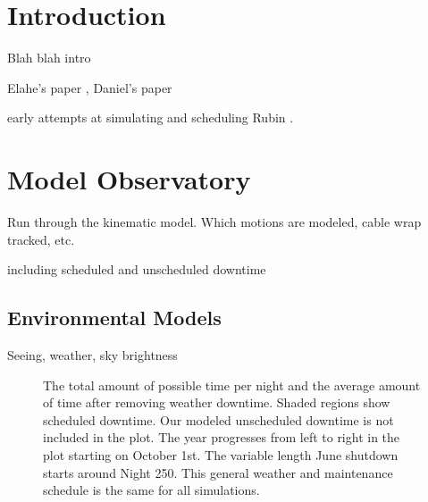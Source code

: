 \documentclass[]{aastex631}
\begin{document}

\section{Introduction} \label{sec:intro}
Blah blah intro

Elahe's paper \citet{Naghib2019}, Daniel's paper \citep{Rothchild2019}

early attempts at simulating and scheduling Rubin \citet{Delgado2014, Delgado2016SPIE}.


\section{Model Observatory}\label{sec:model_obs}


Run through the kinematic model. Which motions are modeled, cable wrap tracked, etc.

including scheduled and unscheduled downtime


\subsection{Environmental Models}
Seeing, weather, sky brightness


\begin{figure}
    \centering
    \caption{The total amount of possible time per night and the average amount of time
after removing weather downtime. Shaded regions show scheduled downtime. Our modeled
unscheduled downtime is not included in the plot. The year progresses from left to right in
the plot starting on October 1st. The variable length June shutdown starts around Night
250. This general weather and maintenance schedule is the same for all simulations.}
    \label{fig:downtime}
\end{figure}
\end{document}

